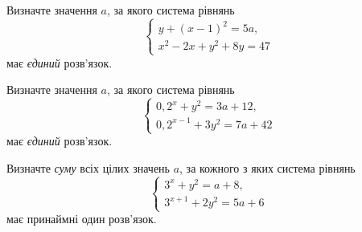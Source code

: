 \documentclass[12pt]{article}
\begin{document}
\begin{samepage}
\noindent\zadnum Визначте значення $a$, за якого система рівнянь
$$
\begin{cases}
y + (x - 1)^2 = 5a, \\
x^2 - 2x + y^2 + 8y = 47
\end{cases}
$$
має \textit{єдиний} розв'язок. 

\nmtnobreak
\nopagebreak\nbvspace{0.3cm}
\nmtAnswerBox
\par{}
\end{samepage}

\begin{samepage}
\noindent\zadnum Визначте значення $a$, за якого система рівнянь
$$
\begin{cases}
0{,}2^x + y^2 = 3a + 12, \\
0{,}2^{x-1} + 3y^2 = 7a + 42
\end{cases}
$$
має \textit{єдиний} розв'язок. 

\nmtnobreak
\nopagebreak\nbvspace{0.3cm}
\nmtAnswerBox
\par{}
\end{samepage}

\begin{samepage}
\noindent\zadnum Визначте \textit{суму} всіх цілих значень $a$, за кожного з яких система рівнянь
$$
\begin{cases}
3^x + y^2 = a + 8, \\
3^{x+1} + 2y^2 = 5a + 6
\end{cases}
$$
має принаймні один розв'язок. 

\nmtnobreak
\nopagebreak\nbvspace{0.3cm}
\nmtAnswerBox
\par{}
\end{samepage}

\begin{samepage}
\nmtAnswerBox
\ifshowsolutions{}\fi
\par{}
\end{samepage}
\end{document}
